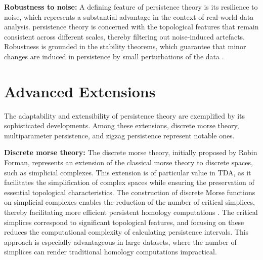 \textbf{Robustness to noise:} A defining feature of persistence theory is its resilience to noise, which represents a substantial advantage in the context of real-world data analysis. persistence theory is concerned with the topological features that remain consistent across different scales, thereby filtering out noise-induced artefacts. Robustness is grounded in the stability theorems, which guarantee that minor changes are induced in persistence by small perturbations of the data \cite{Cohen-Steiner2007}.

\section{Advanced Extensions}
The adaptability and extensibility of persistence theory are exemplified by its sophisticated developments. Among these extensions, discrete morse theory, multiparameter persistence, and zigzag persistence represent notable ones.

\textbf{Discrete morse theory:} The discrete morse theory, initially proposed by Robin Forman, represents an extension of the classical morse theory to discrete spaces, such as simplicial complexes. This extension is of particular value in TDA, as it facilitates the simplification of complex spaces while ensuring the preservation of essential topological characteristics. The construction of discrete Morse functions on simplicial complexes enables the reduction of the number of critical simplices, thereby facilitating more efficient persistent homology computations \cite{Forman2002}. The critical simplices correspond to significant topological features, and focusing on these reduces the computational complexity of calculating persistence intervals. This approach is especially advantageous in large datasets, where the number of simplices can render traditional homology computations impractical.

